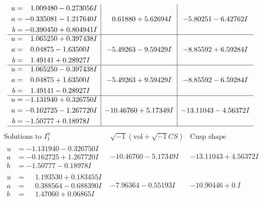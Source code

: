 \documentclass[1p]{elsarticle_modified}
\theoremstyle{definition}
\newcommand{\I}{\sqrt{-1}}
\begin{document}
$$\begin{array}{c|c|c}
\begin{aligned}
u &= \phantom{-}1.009480 - 0.273056 I \\
a &= -0.335081 - 1.217640 I \\
b &= -0.390450 + 0.804941 I\end{aligned}
 & \phantom{-}0.61880 + 5.62694 I & -5.80251 - 6.42762 I \\ \hline\begin{aligned}
u &= \phantom{-}1.065250 + 0.397438 I \\
a &= \phantom{-}0.04875 - 1.63500 I \\
b &= \phantom{-}1.49141 + 0.28927 I\end{aligned}
 & -5.49263 - 9.59429 I & -8.85592 + 6.59284 I \\ \hline\begin{aligned}
u &= \phantom{-}1.065250 - 0.397438 I \\
a &= \phantom{-}0.04875 + 1.63500 I \\
b &= \phantom{-}1.49141 - 0.28927 I\end{aligned}
 & -5.49263 + 9.59429 I & -8.85592 - 6.59284 I \\ \hline\begin{aligned}
u &= -1.131940 + 0.326750 I \\
a &= -0.162725 - 1.267720 I \\
b &= -1.50777 + 0.18978 I\end{aligned}
 & -10.46760 + 5.17349 I & -13.11043 - 4.56372 I\\
 \hline 
 \end{array}$$\newpage$$\begin{array}{c|c|c}  
\text{Solutions to }I^u_{1}& \I (\text{vol} + \sqrt{-1}CS) & \text{Cusp shape}\\
 \hline 
\begin{aligned}
u &= -1.131940 - 0.326750 I \\
a &= -0.162725 + 1.267720 I \\
b &= -1.50777 - 0.18978 I\end{aligned}
 & -10.46760 - 5.17349 I & -13.11043 + 4.56372 I \\ \hline\begin{aligned}
u &= \phantom{-}1.193530 + 0.183455 I \\
a &= \phantom{-}0.388564 - 0.688390 I \\
b &= \phantom{-}1.47060 + 0.06865 I\end{aligned}
 & -7.96364 - 0.55193 I & -10.90446 + 0. I\phantom{ +0.000000I} \\ \hline\begin{aligned}

\end{aligned}
\end{array}$$
\end{document}
